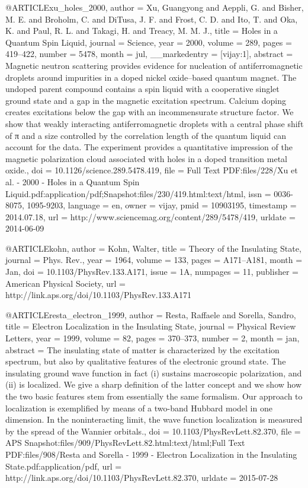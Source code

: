 @ARTICLE{xu_holes_2000,
  author = {Xu, Guangyong and Aeppli, G. and Bisher, M. E. and Broholm, C. and
	DiTusa, J. F. and Frost, C. D. and Ito, T. and Oka, K. and Paul,
	R. L. and Takagi, H. and Treacy, M. M. J.},
  title = {Holes in a Quantum Spin Liquid},
  journal = {Science},
  year = {2000},
  volume = {289},
  pages = {419--422},
  number = {5478},
  month = jul,
  __markedentry = {[vijay:1]},
  abstract = {Magnetic neutron scattering provides evidence for nucleation of antiferromagnetic
	droplets around impurities in a doped nickel oxide–based quantum
	magnet. The undoped parent compound contains a spin liquid with a
	cooperative singlet ground state and a gap in the magnetic excitation
	spectrum. Calcium doping creates excitations below the gap with an
	incommensurate structure factor. We show that weakly interacting
	antiferromagnetic droplets with a central phase shift of π and a
	size controlled by the correlation length of the quantum liquid can
	account for the data. The experiment provides a quantitative impression
	of the magnetic polarization cloud associated with holes in a doped
	transition metal oxide.},
  doi = {10.1126/science.289.5478.419},
  file = {Full Text PDF:files/228/Xu et al. - 2000 - Holes in a Quantum Spin Liquid.pdf:application/pdf;Snapshot:files/230/419.html:text/html},
  issn = {0036-8075, 1095-9203},
  language = {en},
  owner = {vijay},
  pmid = {10903195},
  timestamp = {2014.07.18},
  url = {http://www.sciencemag.org/content/289/5478/419},
  urldate = {2014-06-09}
}

@ARTICLE{kohn,
  author = {Kohn, Walter},
  title = {Theory of the Insulating State},
  journal = {Phys. Rev.},
  year = {1964},
  volume = {133},
  pages = {A171--A181},
  month = {Jan},
  doi = {10.1103/PhysRev.133.A171},
  issue = {1A},
  numpages = {11},
  publisher = {American Physical Society},
  url = {http://link.aps.org/doi/10.1103/PhysRev.133.A171}
}

@ARTICLE{resta_electron_1999,
  author = {Resta, Raffaele and Sorella, Sandro},
  title = {Electron {Localization} in the {Insulating} {State}},
  journal = {Physical Review Letters},
  year = {1999},
  volume = {82},
  pages = {370--373},
  number = {2},
  month = jan,
  abstract = {The insulating state of matter is characterized by the excitation
	spectrum, but also by qualitative features of the electronic ground
	state. The insulating ground wave function in fact (i) sustains macroscopic
	polarization, and (ii) is localized. We give a sharp definition of
	the latter concept and we show how the two basic features stem from
	essentially the same formalism. Our approach to localization is exemplified
	by means of a two-band Hubbard model in one dimension. In the noninteracting
	limit, the wave function localization is measured by the spread of
	the Wannier orbitals.},
  doi = {10.1103/PhysRevLett.82.370},
  file = {APS Snapshot:files/909/PhysRevLett.82.html:text/html;Full Text PDF:files/908/Resta and Sorella - 1999 - Electron Localization in the Insulating State.pdf:application/pdf},
  url = {http://link.aps.org/doi/10.1103/PhysRevLett.82.370},
  urldate = {2015-07-28}
}

